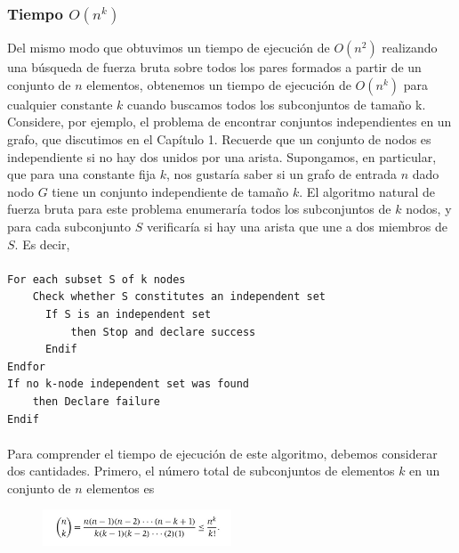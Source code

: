 \documentclass[a4paper]{article}
\begin{document}
\subsubsection*{Tiempo $O(n^k)$} 

Del mismo modo que obtuvimos un tiempo de ejecución de $O(n^2)$ realizando una búsqueda de fuerza bruta sobre todos los pares formados a partir de un conjunto de $n$ elementos, obtenemos un tiempo de ejecución de $O(n^k)$ para cualquier constante $k$ cuando buscamos todos los subconjuntos de tamaño k.\\

Considere, por ejemplo, el problema de encontrar conjuntos independientes en un grafo, que discutimos en el Capítulo 1. Recuerde que un conjunto de nodos es independiente si no hay dos unidos por una arista. Supongamos, en particular, que para una constante fija $k$, nos gustaría saber si un grafo de entrada $n$ dado nodo $G$ tiene un conjunto independiente de tamaño $k$. El algoritmo natural de fuerza bruta para este problema enumeraría todos los subconjuntos de $k$ nodos, y para cada subconjunto $S$ verificaría si hay una arista que une a dos miembros de $S$. Es decir, \\
\paragraph{}
\begin{lstlisting}
For each subset S of k nodes
	Check whether S constitutes an independent set
      If S is an independent set 
          then Stop and declare success
      Endif
Endfor
If no k-node independent set was found 
	then Declare failure
Endif
\end{lstlisting}
\paragraph{}

Para comprender el tiempo de ejecución de este algoritmo, debemos considerar dos cantidades. Primero, el número total de subconjuntos de elementos $k$ en un conjunto de $n$ elementos es\\



\begin{figure}[h] 
  \centering
    \includegraphics[width=0.5\textwidth]{Imagenes-Seccion2/form_2_3.PNG}
\end{figure}
\end{document}
